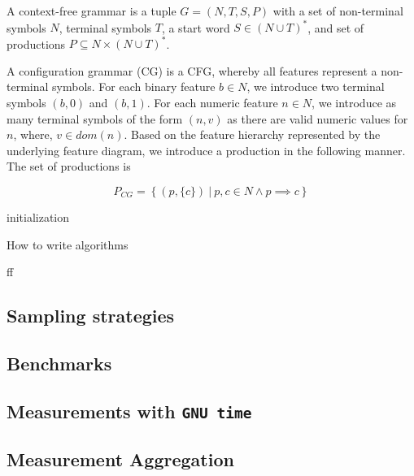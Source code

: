 \documentclass[
	12pt,
	a4paper,
	oneside,
	openright
]{book}
\begin{document}
\begin{definition}
A context-free grammar is a tuple $G = (N, T, S, P)$ with a set of non-terminal
symbols $N$, terminal symbols $T$, a start word $S \in (N \cup T)^*$, and set of
productions $P \subseteq N \times (N \cup T)^*$. 
\end{definition}

\begin{definition}
A configuration grammar (CG) is a CFG, whereby all
features represent a non-terminal symbols. For each binary feature $b \in N$, we
introduce two terminal symbols $(b, 0)$ and $(b, 1)$. For each numeric feature
$n \in N$, we introduce as many terminal symbols of the form $(n, v)$ as
there are valid numeric values for $n$, where, $v \in dom(n)$. Based on the
feature hierarchy represented by the underlying feature diagram, we introduce a
production in the following manner. The set of productions is 

$$P_{CG} = \left\{ (p, \lbrace c \rbrace)~|~ p, c \in N \wedge p \implies  c
\right\} $$

\end{definition}

\begin{algorithm}[H]
 initialization\;
 \caption{How to write algorithms}
\end{algorithm}


ff\cite{shanmugam_statistics_2015}

\subsection{Sampling strategies}
\subsection{Benchmarks}
\subsection{Measurements with \texttt{GNU time}}
\subsection{Measurement Aggregation}
\end{document}
